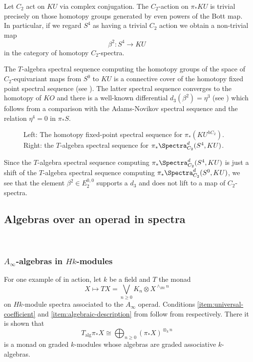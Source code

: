 \documentclass[leqno,oneside,english]{elsarticle}
\begin{document}
\begin{example}
  Let $C_2$ act on $KU$ via complex conjugation. The $C_2$-action on
  $\pi_* KU$ is trivial precisely on those homotopy groups generated
  by even powers of the Bott map. In particular, if we regard $S^4$ as
  having a trivial $C_2$ action we obtain a non-trivial map
  \[\beta^2\colon S^4\rightarrow KU \] in the category of
  homotopy $C_2$-spectra. 
   
  The $T$-algebra spectral sequence computing
  the homotopy groups of the space of $C_2$-equivariant maps from $S^0$
  to $KU$ is a connective cover of the homotopy fixed point spectral
  sequence (see ). The latter spectral sequence converges to the
  homotopy of $KO$ and there is a well-known differential
  $d_3(\beta^2)=\eta^3$ (see \cite[Prop.~5.3.1]{Rog08}) which follows from a comparison with the
  Adams-Novikov spectral sequence and the relation $\eta^4=0$ in $\pi_* S$.  
  \begin{figure}  
  \begin{center}
    \quad \quad \quad {}
    \end{center}
    \caption{\label{fig:ku-ss} Left: The homotopy fixed-point spectral
      sequence for $\pi_*(KU^{hC_2})$.  Right: the $T$-algebra spectral sequence for $\pi_* \Spectra^d_{C_2}(S^4, KU)$.}
  \end{figure}
  Since the $T$-algebra spectral sequence
  computing $\pi_* \Spectra_{C_2}^d(S^4,KU)$ is just a shift of the $T$-algebra spectral sequence computing $\pi_*\Spectra_{C_2}^d(S^0,KU)$, we see that the element $\beta^2\in E_2^{0,0}$
  supports a $d_3$ and does not lift to a map of $C_2$-spectra.
\end{example}

\subsection{Algebras over an operad in spectra}\label{sec:examples-operads}
\ 
\subsubsection*{$A_\infty$-algebras in $Hk$-modules}

For one example of  in action, let $k$ be a field
and $T$ the monad
\[ 
X\mapsto TX=\bigvee_{n\geq 0} K_{n} \otimes X^{\wedge_{Hk}n}
\] 
on $Hk$-module spectra associated to the $A_\infty$ operad.  Conditions
\eqref{item:universal-coefficient} and
\eqref{item:algebraic-description} from  follow from  respectively. There it is shown that
\[ 
T_{\mathrm{alg}}\pi_* X\cong \bigoplus_{n\geq 0} (\pi_*X)^{\otimes_k n} 
\] 
is a monad on graded $k$-modules whose algebras are graded
associative $k$-algebras.
\end{document}
